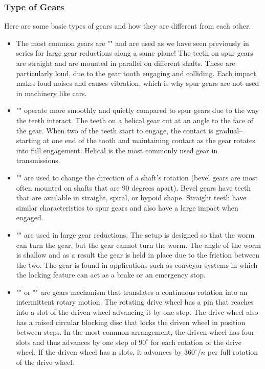 	\subsubsection{Type of Gears}
	Here are some basic types of gears and how they are different from each other.
	
	\begin{itemize}
		\item The most common gears are "" and are used as we have seen previously in series for large gear reductions along a same plane! The teeth on spur gears are straight and are mounted in parallel on different shafts. These are particularly loud, due to the gear tooth engaging and colliding. Each impact makes loud noises and causes vibration, which is why spur gears are not used in machinery like cars. 

		\item "" operate more smoothly and quietly compared to spur gears due to the way the teeth interact. The teeth on a helical gear cut at an angle to the face of the gear. When two of the teeth start to engage, the contact is gradual--starting at one end of the tooth and maintaining contact as the gear rotates into full engagement. Helical is the most commonly used gear in transmissions.

		\item "" are used to change the direction of a shaft’s rotation (bevel gears are most often mounted on shafts that are 90 degrees apart). Bevel gears have teeth that are available in straight, spiral, or hypoid shape. Straight teeth have similar characteristics to spur gears and also have a large impact when engaged.

		\item "" are used in large gear reductions. The setup is designed so that the worm can turn the gear, but the gear cannot turn the worm. The angle of the worm is shallow and as a result the gear is held in place due to the friction between the two. The gear is found in applications such as conveyor systems in which the locking feature can act as a brake or an emergency stop.
		
		\item "" or "" are gears mechanism that translates a continuous rotation into an intermittent rotary motion. The rotating drive wheel has a pin that reaches into a slot of the driven wheel advancing it by one step. The drive wheel also has a raised circular blocking disc that locks the driven wheel in position between steps. In the most common arrangement, the driven wheel has four slots and thus advances by one step of $90^\circ$ for each rotation of the drive wheel. If the driven wheel has n slots, it advances by $360^\circ/n$ per full rotation of the drive wheel.
	\end{itemize}
